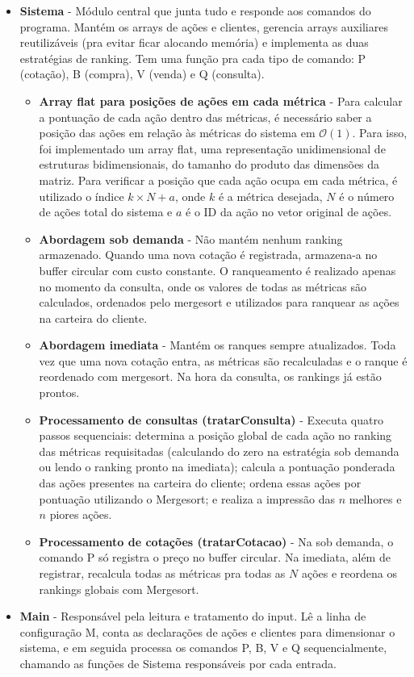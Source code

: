 \documentclass[12pt,a4paper]{article}
\begin{document}
\begin{itemize}
\item \textbf{Sistema} - Módulo central que junta tudo e responde aos comandos do programa. Mantém os arrays de ações e clientes, gerencia arrays auxiliares reutilizáveis (pra evitar ficar alocando memória) e implementa as duas estratégias de ranking. Tem uma função pra cada tipo de comando: P (cotação), B (compra), V (venda) e Q (consulta).
\begin{itemize}
    \item \textbf{Array flat para posições de ações em cada métrica} - Para calcular a pontuação de cada ação dentro das métricas, é necessário saber a posição das ações em relação às métricas do sistema em $\mathcal{O}(1)$. Para isso, foi implementado um array flat, uma representação unidimensional de estruturas bidimensionais, do tamanho do produto das dimensões da matriz. Para verificar a posição que cada ação ocupa em cada métrica, é utilizado o índice $k \times N + a$, onde $k$ é a métrica desejada, $N$ é o número de ações total do sistema e $a$ é o ID da ação no vetor original de ações.
    \item \textbf{Abordagem sob demanda} - Não mantém nenhum ranking armazenado. Quando uma nova cotação é registrada, armazena-a no buffer circular com custo constante. O ranqueamento é realizado apenas no momento da consulta, onde os valores de todas as métricas são calculados, ordenados pelo mergesort e utilizados para ranquear as ações na carteira do cliente.
    \item \textbf{Abordagem imediata} - Mantém os ranques sempre atualizados. Toda vez que uma nova cotação entra, as métricas são recalculadas e o ranque é reordenado com mergesort. Na hora da consulta, os rankings já estão prontos.
    \item \textbf{Processamento de consultas (tratarConsulta)} - Executa quatro passos sequenciais: determina a posição global de cada ação no ranking das métricas requisitadas (calculando do zero na estratégia sob demanda ou lendo o ranking pronto na imediata); calcula a pontuação ponderada das ações presentes na carteira do cliente; ordena essas ações por pontuação utilizando o Mergesort; e realiza a impressão das $n$ melhores e $n$ piores ações.
    \item \textbf{Processamento de cotações (tratarCotacao)} - Na sob demanda, o comando P só registra o preço no buffer circular. Na imediata, além de registrar, recalcula todas as métricas pra todas as $N$ ações e reordena os rankings globais com Mergesort.
\end{itemize}

\item \textbf{Main} - Responsável pela leitura e tratamento do input. Lê a linha de configuração M, conta as declarações de ações e clientes para dimensionar o sistema, e em seguida processa os comandos P, B, V e Q sequencialmente, chamando as funções de Sistema responsáveis por cada entrada.

\end{itemize}
\end{document}
